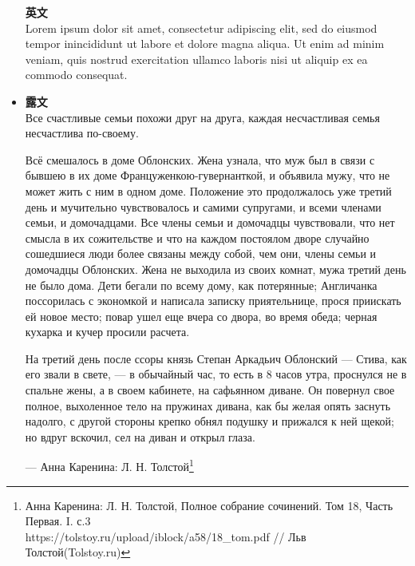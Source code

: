 \documentclass[a4paper,10pt]{ltjsarticle}
\begin{document}
\begin{itemize}
\textbf{英文}\\
\hspace{3mm} Lorem ipsum dolor sit amet, consectetur adipiscing elit, sed do eiusmod tempor inincididunt ut labore et dolore magna aliqua. Ut enim ad minim veniam, quis nostrud exercitation ullamco laboris nisi ut aliquip ex ea commodo consequat.\vspace{2mm}
\par
  \item[]
\textbf{露文}\\
\hspace{3mm}Все счастливые семьи похожи друг на друга, каждая несчастливая семья несчастлива по-своему.\par
\hspace{3mm}Всё смешалось в доме Облонских. Жена узнала, что муж был в связи с бывшею в их доме Француженкою-гувернанткой, и объявила мужу, что не может жить с ним в одном доме. Положение это продолжалось уже третий день и мучительно чувствовалось и самими супругами, и всеми членами семьи, и домочадцами. Все члены семьи и домочадцы чувствовали, что нет смысла в их сожительстве и что на каждом постоялом дворе случайно сошедшиеся люди более связаны между собой, чем они, члены семьи и домочадцы Облонских. Жена не выходила из своих комнат, мужа третий день не было дома. Дети бегали по всему дому, как потерянные; Англичанка поссорилась с экономкой и написала записку приятельнице, прося приискать ей новое место; повар ушел еще вчера со двора, во время обеда; черная кухарка и кучер просили расчета.\par
\hspace{3mm} На третий день после ссоры князь Степан Аркадьич Облонский — Стива, как его звали в свете, — в обычайный час, то есть в 8 часов утра, проснулся не в спальне жены, а в своем кабинете, на сафьянном диване. Он повернул свое полное, выхоленное тело на пружинах дивана, как бы желая опять заснуть надолго, с другой стороны крепко обнял подушку и прижался к ней щекой; но вдруг вскочил, сел на диван и открыл глаза.\par 
\hspace{80mm}— Анна Каренина: Л. Н. Толстой\footnote{Анна Каренина: Л. Н. Толстой, Полное собрание сочинений. Том 18, Часть Первая. I. с.3\\
https://tolstoy.ru/upload/iblock/a58/18\_tom.pdf // Льв Толстой(Tolstoy.ru)}
\end{itemize}
\end{document}
